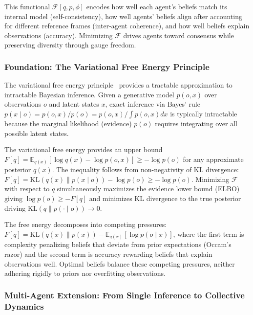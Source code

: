 \documentclass[11pt]{article}
\begin{document}
This functional $\mathcal{F}[q, p, \phi]$ encodes how well each agent's beliefs match its internal model (self-consistency), how well agents' beliefs align after accounting for different reference frames (inter-agent coherence), and how well beliefs explain observations (accuracy). Minimizing $\mathcal{F}$ drives agents toward consensus while preserving diversity through gauge freedom.

\subsubsection{Foundation: The Variational Free Energy Principle}

The variational free energy principle~\cite{Friston2010, parr2022active} provides a tractable approximation to intractable Bayesian inference. Given a generative model $p(o, x)$ over observations $o$ and latent states $x$, exact inference via Bayes' rule $p(x \mid o) = p(o, x)/p(o) = p(o, x)/\int p(o, x)  dx$ is typically intractable because the marginal likelihood (evidence) $p(o)$ requires integrating over all possible latent states.

The variational free energy provides an upper bound $F[q] = \mathbb{E}_{q(x)}[\log q(x) - \log p(o, x)] \geq -\log p(o)$ for any approximate posterior $q(x)$. The inequality follows from non-negativity of KL divergence: $F[q] = \mathrm{KL}(q(x) \| p(x \mid o)) - \log p(o) \geq -\log p(o)$. Minimizing $\mathcal{F}$ with respect to $q$ simultaneously maximizes the evidence lower bound (ELBO) giving $\log p(o) \geq -F[q]$ and minimizes KL divergence to the true posterior driving $\mathrm{KL}(q \| p(\cdot \mid o)) \to 0$.

The free energy decomposes into competing pressures: $F[q] = \mathrm{KL}(q(x) \| p(x)) - \mathbb{E}_{q(x)}[\log p(o \mid x)]$, where the first term is complexity penalizing beliefs that deviate from prior expectations (Occam's razor) and the second term is accuracy rewarding beliefs that explain observations well. Optimal beliefs balance these competing pressures, neither adhering rigidly to priors nor overfitting observations.

\subsubsection{Multi-Agent Extension: From Single Inference to Collective Dynamics}
\end{document}
